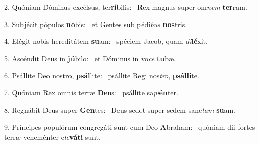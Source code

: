 2. Quóniam Dóminus excélsus, ter\textbf{rí}bilis: \ast\  Rex magnus super om\textit{nem} \textbf{ter}ram.\

3. Subjécit pópulos \textbf{no}bis: \ast\  et Gentes sub pédi\textit{bus} \textbf{nos}tris.\

4. Elégit nobis hereditátem \textbf{su}am: \ast\  spéciem Jacob, quam \textit{di}\textbf{lé}xit.\

5. Ascéndit Deus in \textbf{jú}bilo: \ast\  et Dóminus in vo\textit{ce} \textbf{tu}bæ.\

6. Psállite Deo nostro, \textbf{psál}lite: \ast\  psállite Regi nos\textit{tro}, \textbf{psál}\textbf{li}te.\

7. Quóniam Rex omnis terræ \textbf{De}us: \ast\  psállite sa\textit{pi}\textbf{én}ter.\

8. Regnábit Deus super \textbf{Gen}tes: \ast\  Deus sedet super sedem sanc\textit{tam} \textbf{su}am.\

9. Príncipes populórum congregáti sunt cum Deo \textbf{A}braham: \ast\  quóniam dii fortes terræ veheménter e\textit{le}\textbf{vá}\textbf{ti} sunt.\

